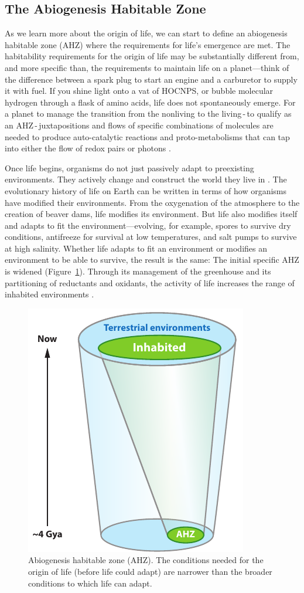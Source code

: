 \subsection{The Abiogenesis Habitable Zone}
As we learn more about the origin of life, we can start to define an abiogenesis habitable zone (AHZ) where the requirements for life's emergence are met. The habitability requirements for the origin of life may be substantially different from, and more specific than, the requirements to maintain life on a planet—think of the difference between a spark plug to start an engine and a carburetor to supply it with fuel. If you shine light onto a vat of HOCNPS, or bubble molecular hydrogen through a flask of amino acids, life does not spontaneously emerge. For a planet to manage the transition from the nonliving to the living\,-\,to qualify as an AHZ\,-\,juxtapositions and flows of specific combinations of molecules are needed to produce auto-catalytic reactions and proto-metabolisms that can tap into either the flow of redox pairs or photons \citep{DeDuve1995, Lane2010}.

Once life begins, organisms do not just passively adapt to preexisting environments. They actively change and construct the world they live in \citep{Odling-Smee2003}. The evolutionary history of life on Earth can be written in terms of how organisms have modified their environments. From the oxygenation of the atmosphere to the creation of beaver dams, life modifies its environment. But life also modifies itself and adapts to fit the environment—evolving, for example, spores to survive dry conditions, antifreeze for survival at low temperatures, and salt pumps to survive at high salinity. Whether life adapts to fit an environment or modifies an environment to be able to survive, the result is the same: The initial specific AHZ is widened (Figure~\ref{fig:AR6}). Through its management of the greenhouse and its partitioning of reductants and oxidants, the activity of life increases the range of inhabited environments \citep{Nisbet2007,Hazen2008}. 

\begin{figure}[!hbt]
	\centering
	\includegraphics[width=0.5\linewidth]{figures/AnnRevs/AR6.pdf}
	\caption[Abiogenesis habitable zone]{Abiogenesis habitable zone (AHZ). The conditions needed for the origin of life (before life could adapt) are narrower than the broader conditions to which life can adapt.}
	\label{fig:AR6}
\end{figure}

